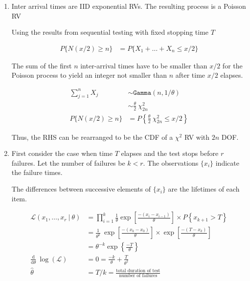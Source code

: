 \begin{enumerate}
\begin{table}[H]
	\end{table}
	\bigskip
	
	\item Inter arrival times are IID exponential RVs. The resulting process is a Poisson RV
	
	Using the results from sequential testing with fixed stopping time \(T\)

	\begin{align}
		P\{N(x/2) \geq n\} &= P\{X_1 + \dots + X_n \leq x/2\}
	\end{align}

	The sum of the first \(n\) inter-arrival times have to be smaller than \(x/2\) for the Poisson process to yield an integer not smaller than \(n\) after time \(x/2\) elapses.

	\begin{align}
		\sum\limits_{j=1}^{n} X_j &\sim \texttt{Gamma}(n, 1/\theta) \nonumber \\[1ex]
		&\sim \frac{\theta}{2}\ \chi^2_{2n} \nonumber \\[1ex]
		P\{N(x/2) \geq n\} &= P\left\{ \frac{\theta}{2}\ \chi^2_{2n} \leq x/2 \right\}
	\end{align}

	Thus, the RHS can be rearranged to be the CDF of a \(\chi^2\) RV with \(2n\) DOF.
	
	\item First consider the case when time \(T\) elapses and the test stops before \(r\) failures. Let the number of failures be \(k < r\). The observations \(\{x_i\}\) indicate the failure times.
	
	The differences between successive elements of \(\{x_i\}\) are the lifetimes of each item.

	\begin{align}
		\mathcal{L}(x_1, \dots, x_r\ |\ \theta) &= \prod_{i=1}^{k} \frac{1}{\theta} \exp\left[ \frac{-(x_i - x_{i-1})}{\theta} \right] \times P\left\{ x_{k+1} > T  \right\} \\[1ex]
		&= \frac{1}{\theta^k}\ \exp \left[ \frac{- (x_k - x_0)}{\theta} \right] \times \exp \left[ \displaystyle\frac{- (T - x_k)}{\theta} \right] \\[1ex]
		&= \theta^{-k} \exp \left\{ \frac{-T}{\theta} \right\} \\[1ex]
		\frac{\mathrm{d}}{\mathrm{d}\theta} \ \log (\mathcal{L}) &= 0 = \frac{-k}{\theta} + \frac{T}{\theta^2} \nonumber \\[1ex]
		\widehat{\theta} &= T/k = \frac{\text{total duration of test}}{\text{number of failures}}
	\end{align}


\end{enumerate}
